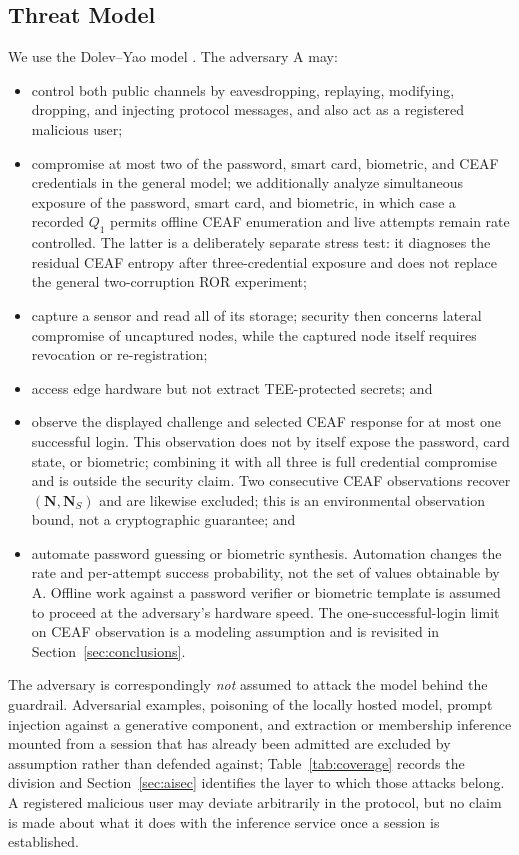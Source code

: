 \documentclass[cmc,article,submit,moreauthors,pdftex]{Definitions/tsp}
\renewcommand{\mathcal}[1]{\mathrm{#1}}
\newcommand{\advA}{\mathcal{A}}
\begin{document}
\subsection{Threat Model}\label{sec:threat}

We use the Dolev--Yao model \cite{liu2019robust,liu2021sgx,li2019twofactor}. The adversary $\advA$ may:

\begin{itemize}
\item control both public channels by eavesdropping, replaying, modifying, dropping, and injecting protocol messages, and also act as a registered malicious user;
\item compromise at most two of the password, smart card, biometric, and CEAF credentials in the general model; we additionally analyze simultaneous exposure of the password, smart card, and biometric, in which case a recorded $Q_1$ permits offline CEAF enumeration and live attempts remain rate controlled. The latter is a deliberately separate stress test: it diagnoses the residual CEAF entropy after three-credential exposure and does not replace the general two-corruption ROR experiment;
\item capture a sensor and read all of its storage; security then concerns lateral compromise of uncaptured nodes, while the captured node itself requires revocation or re-registration;
\item access edge hardware but not extract TEE-protected secrets; and
\item observe the displayed challenge and selected CEAF response for at most one successful login. This observation does not by itself expose the password, card state, or biometric; combining it with all three is full credential compromise and is outside the security claim. Two consecutive CEAF observations recover $(\mathbf{N},\mathbf{N}_S)$ and are likewise excluded; this is an environmental observation bound, not a cryptographic guarantee; and
\item automate password guessing or biometric synthesis. Automation changes the rate and per-attempt success probability, not the set of values obtainable by $\advA$. Offline work against a password verifier or biometric template is assumed to proceed at the adversary's hardware speed. The one-successful-login limit on CEAF observation is a modeling assumption and is revisited in Section~\ref{sec:conclusions}.
\end{itemize}

The adversary is correspondingly \emph{not} assumed to attack the model behind the guardrail. Adversarial examples, poisoning of the locally hosted model, prompt injection against a generative component, and extraction or membership inference mounted from a session that has already been admitted are excluded by assumption rather than defended against; Table~\ref{tab:coverage} records the division and Section~\ref{sec:aisec} identifies the layer to which those attacks belong. A registered malicious user may deviate arbitrarily in the protocol, but no claim is made about what it does with the inference service once a session is established.
\end{document}
